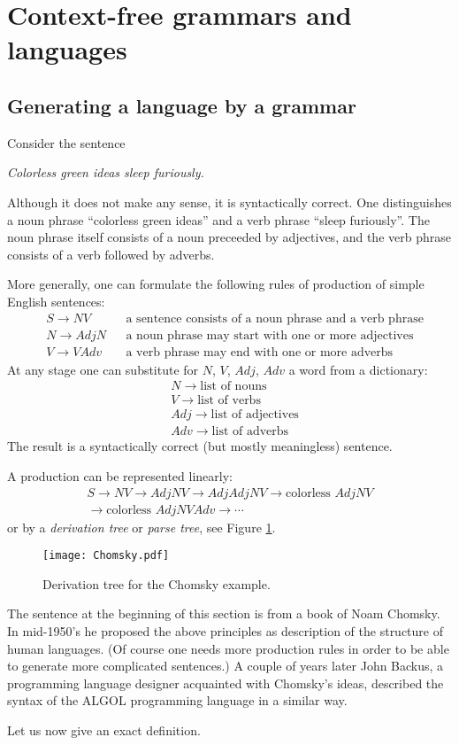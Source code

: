\section{Context-free grammars and languages}
\subsection{Generating a language by a grammar}
\label{sec:LangGram}
Consider the sentence
\begin{center}
\emph{Colorless green ideas sleep furiously.}
\end{center}
Although it does not make any sense, it is syntactically correct.
One distinguishes a noun phrase ``colorless green ideas'' and a verb phrase ``sleep furiously''.
The noun phrase itself consists of a noun preceeded by adjectives, and the verb phrase consists of a verb followed by adverbs.

More generally, one can formulate the following rules of production of simple English sentences:
\begin{align*}
&S \to NV &&\text{a sentence consists of a noun phrase and a verb phrase}\\
&N \to AdjN &&\text{a noun phrase may start with one or more adjectives}\\
&V \to VAdv &&\text{a verb phrase may end with one or more adverbs}
\end{align*}
At any stage one can substitute for $N$, $V$, $Adj$, $Adv$ a word from a dictionary:
\begin{align*}
&N \to \text{list of nouns}\\
&V \to \text{list of verbs}\\
&Adj \to \text{list of adjectives}\\
&Adv \to \text{list of adverbs}
\end{align*}
The result is a syntactically correct (but mostly meaningless) sentence.

A production can be represented linearly:
\begin{multline*}
S \to NV \to AdjNV \to AdjAdjNV \to \text{colorless }AdjNV\\
\to \text{colorless }AdjNVAdv \to \cdots
\end{multline*}
or by a \emph{derivation tree} or \emph{parse tree}, see Figure \ref{fig:Chomsky}.

\begin{figure}[ht]
\begin{center}
\texttt{[image: Chomsky.pdf]}
\end{center}
\caption{Derivation tree for the Chomsky example.}
\label{fig:Chomsky}
\end{figure}

The sentence at the beginning of this section is from a book of Noam Chomsky.
In mid-1950's he proposed the above principles as description of the structure of human languages.
(Of course one needs more production rules in order to be able to generate more complicated sentences.)
A couple of years later John Backus, a programming language designer acquainted with Chomsky's ideas,
described the syntax of the ALGOL programming language in a similar way.

Let us now give an exact definition.